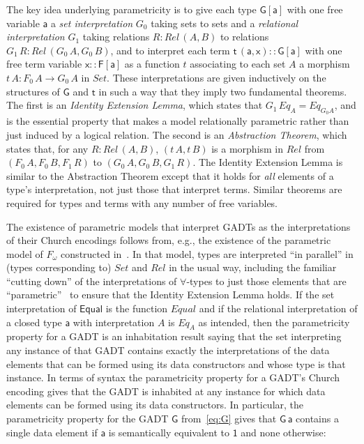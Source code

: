 \documentclass[acmsmall,screen,review,anonymous]{acmart}
\theoremstyle{definition}
\begin{document}
The key idea underlying parametricity is to give each type
$\mathsf{G[a]}$ with one free variable $\mathsf{a}$ a {\em set
  interpretation} $G_0$ taking sets to sets and a \emph{relational
  interpretation} $G_1$ taking relations $R : \mathit{Rel}\,(A,B)$ to
relations $G_1 \,R : \mathit{Rel}\,(G_0 \,A, G_0 \,B)$, and to
interpret each term $\mathsf{t\,(a,x) :: G[a]}$ with one free term
variable $\mathsf{x :: F[a]}$ as a function $t$ associating to each
set $A$ a morphism $t \,A : F_0\,A \to G_0\,A$ in $\mathit{Set}$.
These interpretations are given inductively on the structures of
$\mathsf{G}$ and $\mathsf{t}$ in such a way that they imply two
fundamental theorems. The first is an \emph{Identity Extension Lemma},
which states that $G_1\,\mathit{Eq}_A = \mathit{Eq}_{G_0 A}$, and is
the essential property that makes a model relationally parametric
rather than just induced by a logical relation.  The second is an
\emph{Abstraction Theorem}, which states that, for any $R
:\mathit{Rel}\,(A, B)$, $(t\, A, t\,B)$ is a morphism in
$\mathit{Rel}$ from $(F_0\,A,F_0\,B,F_1\,R)$ to
$(G_0\,A,G_0\,B,G_1\,R)$. The Identity Extension Lemma is similar to
the Abstraction Theorem except that it holds for {\em all} elements of
a type's interpretation, not just those that interpret terms.  Similar
theorems are required for types and terms with any number of free
variables.

The existence of parametric models that interpret GADTs as the
interpretations of their Church encodings follows from, e.g., the
existence of the parametric model of $F_\omega$ constructed
in~\cite{atk12}.  In that model, types are interpreted ``in parallel''
in (types corresponding to) $\mathit{Set}$ and $\mathit{Rel}$ in the
usual way, including the familiar ``cutting down'' of the
interpretations of $\forall$-types to just those elements that are
``parametric''~\cite{rey83,wad89} to ensure that the Identity
Extension Lemma holds. If the set interpretation of $\mathsf{Equal}$
is the function $\mathit{Equal}$ and if the relational interpretation
of a closed type $\mathsf{a}$ with interpretation $A$ is
$\mathit{Eq_A}$ as intended, then the parametricity property for a
GADT is an inhabitation result saying that the set interpreting any
instance of that GADT contains exactly the interpretations of the data
elements that can be formed using its data constructors and whose type
is that instance. In terms of syntax the parametricity property for a
GADT's Church encoding gives that the GADT is inhabited at any
instance for which data elements can be formed using its data
constructors. In particular, the parametricity property for the GADT
$\mathsf{G}$ from~\eqref{eq:G} gives that $\mathsf{G\,a}$ contains a
single data element if $\mathsf{a}$ is semantically equivalent to
$\mathsf{1}$ and none otherwise:
\end{document}
